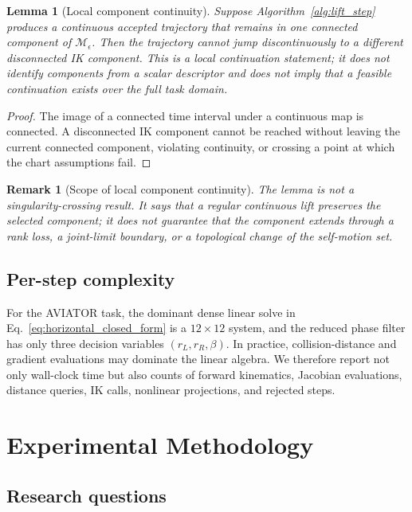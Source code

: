 \documentclass[preprint,12pt]{elsarticle}
\newtheorem{lemma}{Lemma}
\newtheorem{remark}{Remark}
\begin{document}
\begin{lemma}[Local component continuity]
\label{prop:branch}
Suppose Algorithm~\ref{alg:lift_step} produces a continuous accepted trajectory that remains in one connected component of $\mathcal M_{\epsilon}$. Then the trajectory cannot jump discontinuously to a different disconnected IK component. This is a local continuation statement; it does not identify components from a scalar descriptor and does not imply that a feasible continuation exists over the full task domain.
\end{lemma}
\begin{proof}
The image of a connected time interval under a continuous map is connected. A disconnected IK component cannot be reached without leaving the current connected component, violating continuity, or crossing a point at which the chart assumptions fail.
\end{proof}

\begin{remark}[Scope of local component continuity]
The lemma is not a singularity-crossing result. It says that a regular continuous lift preserves the selected component; it does not guarantee that the component extends through a rank loss, a joint-limit boundary, or a topological change of the self-motion set.
\end{remark}

\subsection{Per-step complexity}

For the AVIATOR task, the dominant dense linear solve in Eq.~\eqref{eq:horizontal_closed_form} is a $12\times12$ system, and the reduced phase filter has only three decision variables $(r_L,r_R,\beta)$. In practice, collision-distance and gradient evaluations may dominate the linear algebra. We therefore report not only wall-clock time but also counts of forward kinematics, Jacobian evaluations, distance queries, IK calls, nonlinear projections, and rejected steps.

\section{Experimental Methodology}
\label{sec:experiments}

\subsection{Research questions}
\end{document}

